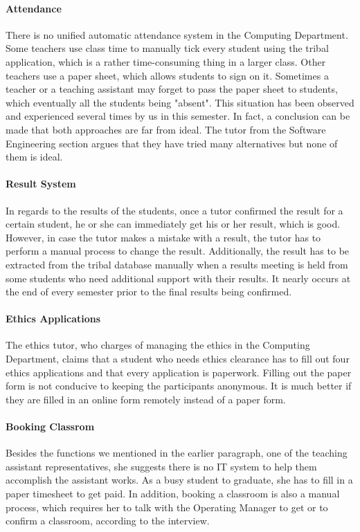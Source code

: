 \paragraph{Attendance}
There is no unified automatic attendance system in the Computing Department. Some teachers use class time to manually tick every student using the tribal application, which is a rather time-consuming thing in a larger class. Other teachers use a paper sheet, which allows students to sign on it. Sometimes a teacher or a teaching assistant may forget to pass the paper sheet to students, which eventually all the students being "absent". This situation has been observed and experienced several times by us in this semester. In fact, a conclusion can be made that both approaches are far from ideal. The tutor from the Software Engineering section argues that they have tried many alternatives but none of them is ideal.

\paragraph{Result System}
In regards to the results of the students, once a tutor confirmed the result for a certain student, he or she can immediately get his or her result, which is good. However, in case the tutor makes a mistake with a result, the tutor has to perform a manual process to change the result. Additionally, the result has to be extracted from the tribal database manually when a results meeting is held from some students who need additional support with their results. It nearly occurs at the end of every semester prior to the final results being confirmed. 

\paragraph{Ethics Applications}
The ethics tutor, who charges of managing the ethics in the Computing Department, claims that a student who needs ethics clearance has to fill out four ethics applications and that every application is paperwork. Filling out the paper form is not conducive to keeping the participants anonymous. It is much better if they are filled in an online form remotely instead of a paper form.

\paragraph{Booking Classrom}
Besides the functions we mentioned in the earlier paragraph, one of the teaching assistant representatives, she suggests there is no IT system to help them accomplish the assistant works. As a busy student to graduate, she has to fill in a paper timesheet to get paid. In addition, booking a classroom is also a manual process, which requires her to talk with the Operating Manager to get or to confirm a classroom, according to the interview.

